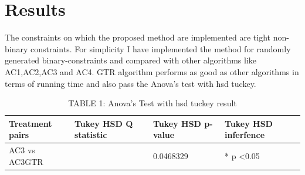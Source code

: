 \documentclass[11pt , conference]{IEEEtran}
\begin{document}
\section{Results}
\noindent The constraints on which the proposed method are implemented are tight non-binary constraints. For simplicity I have implemented the method for randomly generated binary-constraints and compared with other algorithms like AC1,AC2,AC3 and AC4. GTR algorithm performs as good as other algorithms in terms of running time and also pass the Anova's test with hsd tuckey.\begin{table}[!ht]
	\fontsize{8}{10} \selectfont
	\begin{tabular}{|L{2cm}|L{1.4cm}|L{1.7cm}|L{1.5cm}|}\hline
		\centering
		Treatment pairs & Tukey HSD Q statistic &  Tukey HSD p-value & Tukey HSD 
		inferfence\\ \hline
		\centering	AC3 vs AC3GTR &  & 0.0468329 & * p \textless  0.05\\ \hline
	\end{tabular}
\vspace*{0.1em}
	\caption*{TABLE 1: Anova's Test with hsd tuckey result}
	\label{tab:tuckey_test_result}
\end{table}\newpage
	





\end{document}
